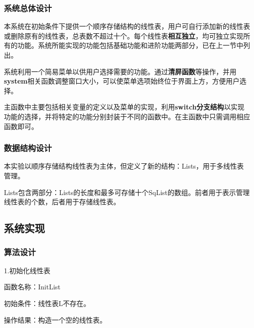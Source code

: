 \documentclass[supercite]{Experimental_Report}
\theoremstyle{definition}
\begin{document}
\subsubsection{系统总体设计}
本系统在初始条件下提供一个顺序存储结构的线性表，用户可自行添加新的线性表或删除原有的线性表，总表数不超过十个。每个线性表\textbf{相互独立}，均可独立实现所有的功能。系统所能实现的功能包括基础功能和进阶功能两部分，已在上一节中列出。

系统利用一个简易菜单以供用户选择需要的功能。通过\textbf{清屏函数}等操作，并用\textbf{system}相关函数调整窗口大小，可以使菜单选项始终位于界面上方，方便用户选择。

主函数中主要包括相关变量的定义以及菜单的实现，利用\textbf{switch分支结构}以实现功能的选择，并将特定的功能分别封装于不同的函数中。在主函数中只需调用相应函数即可。
\subsubsection{数据结构设计}
本实验以顺序存储结构线性表为主体，但定义了新的结构：Lists，用于多线性表管理。

Lists包含两部分：Lists的长度和最多可存储十个SqList的数组。前者用于表示管理线性表的个数，后者用于存储线性表。

\newpage

\subsection{系统实现}
\subsubsection{算法设计}

1.初始化线性表
	
函数名称：InitList

初始条件：线性表L不存在。

操作结果：构造一个空的线性表。
\end{document}
